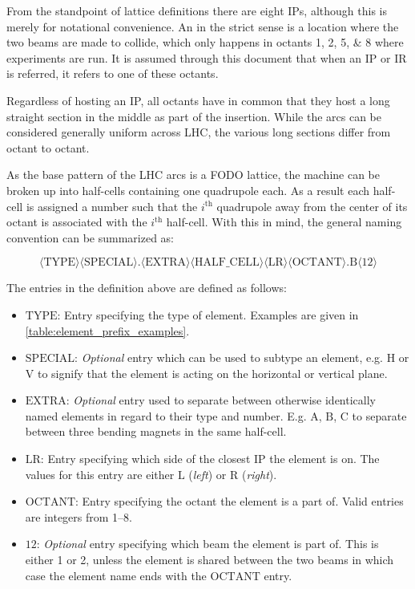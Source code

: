 From the standpoint of lattice definitions there are eight IPs, although this is merely for notational convenience. 
An  in the strict sense is a location where the two beams are made to collide, which only happens in octants \numlist{1;2;5;8} where experiments are run.
It is assumed through this document that when an IP or IR is referred, it refers to one of these octants.

Regardless of hosting an IP, all octants have in common that they host a long straight section in the middle as part of the insertion.
While the arcs can be considered generally uniform across LHC, the various long sections differ from octant to octant.

As the base pattern of the LHC arcs is a FODO lattice, the machine can be broken up into half-cells containing one quadrupole each.
As a result each half-cell is assigned a number such that the \(i^{\mathrm{th}}\) quadrupole away from the center of its octant is associated with the \(i^{\mathrm{th}}\) half-cell.
With this in mind, the general naming convention can be summarized as:

\begin{equation*}
        \langle \mathrm{TYPE} \rangle \langle \mathrm{SPECIAL} \rangle . \langle \mathrm{EXTRA} \rangle \langle \mathrm{HALF\_CELL} \rangle \langle \mathrm {LR} \rangle \langle \mathrm{OCTANT} \rangle . \mathrm{B} \langle \mathrm{12} \rangle
    \label{equation:lhc_naming_nomenclature}
\end{equation*}

The entries in the definition above are defined as follows:
\begin{itemize}
    \item \(\mathrm{TYPE}\): Entry specifying the type of element. Examples are given in \cref{table:element_prefix_examples}.
    \item \(\mathrm{SPECIAL}\): \textit{Optional} entry which can be used to subtype an element, e.g. \(\mathrm{H}\) or \(\mathrm{V}\) to signify that the element is acting on the horizontal or vertical plane.
    \item \(\mathrm{EXTRA}\): \textit{Optional} entry used to separate between otherwise identically named elements in regard to their type and number. E.g. \(\mathrm{A}\), \(\mathrm{B}\), \(\mathrm{C}\) to separate between three bending magnets in the same half-cell.
    \item \(\mathrm{LR}\): Entry specifying which side of the closest IP the element is on. The values for this entry are either \(\mathrm{L}\) (\textit{left}) or \(\mathrm{R}\) (\textit{right}).
    \item \(\mathrm{OCTANT}\): Entry specifying the octant the element is a part of. Valid entries are integers from \numrange{1}{8}.
    \item \(\mathrm{12}\): \textit{Optional} entry specifying which beam the element is part of. This is either \num{1} or \num{2}, unless the element is shared between the two beams in which case the element name ends with the \(\mathrm{OCTANT}\) entry.
\end{itemize}

